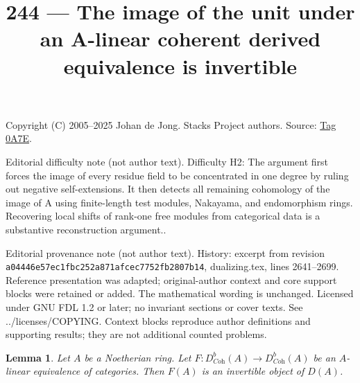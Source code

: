 \documentclass{amsart}
\theoremstyle{plain}
\newtheorem{lemma}[subsection]{Lemma}
\theoremstyle{definition}
\theoremstyle{remark}
\numberwithin{equation}{subsection}
\begin{document}
\title[Stacks Project, Tag 0A7E]{244 --- The image of the unit under an A-linear coherent derived equivalence is invertible}
\maketitle
\noindent Copyright (C) 2005--2025 Johan de Jong. Stacks Project authors. Source: \href{https://stacks.math.columbia.edu/tag/0A7E}{Tag 0A7E}.

\noindent Editorial difficulty note (not author text). Difficulty H2: The argument first forces the image of every residue field to be concentrated in one degree by ruling out negative self-extensions. It then detects all remaining cohomology of the image of A using finite-length test modules, Nakayama, and endomorphism rings. Recovering local shifts of rank-one free modules from categorical data is a substantive reconstruction argument..

\noindent Editorial provenance note (not author text). History: excerpt from revision \texttt{a0444\allowbreak 6e57e\allowbreak c1fbc\allowbreak 252a8\allowbreak 71afc\allowbreak ec775\allowbreak 2fb28\allowbreak 07b14}, dualizing.tex, lines 2641--2699. Reference presentation was adapted; original-author context and core support blocks were retained or added. The mathematical wording is unchanged. Licensed under GNU FDL 1.2 or later; no invariant sections or cover texts. See ../licenses/COPYING. Context blocks reproduce author definitions and supporting results; they are not additional counted problems.

\begin{lemma}
\label{lemma-equivalence-comes-from-invertible}
Let $A$ be a Noetherian ring. Let
$F : D^b_{\textit{Coh}}(A) \to D^b_{\textit{Coh}}(A)$ be an $A$-linear
equivalence of categories. Then $F(A)$ is an invertible object of $D(A)$.
\end{lemma}
\end{document}
